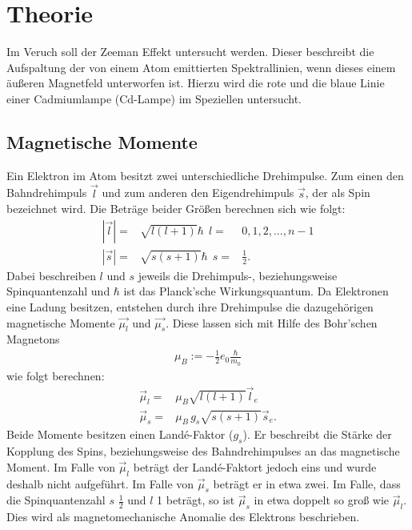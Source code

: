 \section{Theorie}
Im Veruch soll der Zeeman Effekt untersucht werden. Dieser beschreibt die Aufspaltung der
von einem Atom emittierten Spektrallinien, wenn dieses einem äußeren Magnetfeld unterworfen
ist. Hierzu wird die rote und die blaue Linie einer Cadmiumlampe (Cd-Lampe) im Speziellen
untersucht.
\subsection{Magnetische Momente}
Ein Elektron im Atom besitzt zwei unterschiedliche Drehimpulse. Zum einen den Bahndrehimpuls
$\vec{l}$ und zum anderen den Eigendrehimpuls $\vec{s}$, der als Spin bezeichnet wird.
Die Beträge beider Größen berechnen sich wie folgt:
\begin{align*}
    |\vec{l}| =& \sqrt{l(l+1)}\hbar \ \ l =& {0, 1, 2, ..., n-1}\\
    |\vec{s}| =& \sqrt{s(s+1)}\hbar \ \ s =& \frac{1}{2}.
\end{align*}
Dabei beschreiben $l$ und $s$ jeweils die Drehimpuls-, beziehungsweise Spinquantenzahl
und $\hbar$ ist das Planck'sche Wirkungsquantum.
Da Elektronen eine Ladung besitzen, entstehen durch ihre Drehimpulse die dazugehörigen
magnetische Momente $\vec{\mu_l}$ und $\vec{\mu_s}$.
Diese lassen sich mit Hilfe des Bohr'schen Magnetons
\FloatBarrier
\begin{align*}
    \mu_B := -\frac{1}{2}e_0\frac{\hbar}{m_0}
\end{align*}
wie folgt berechnen:
\begin{align*}
    \vec{\mu}_l =& \mu_B\sqrt{l(l+1)}\vec{l}_e\\
    \vec{\mu}_s =& \mu_B \, g_s \sqrt{s(s+1)} \vec{s}_e .
\end{align*}
Beide Momente besitzen einen Landé-Faktor ($g_s$). Er beschreibt die Stärke der Kopplung des
Spins, beziehungsweise des Bahndrehimpulses an das magnetische Moment. Im Falle von
$\vec{\mu}_l$ beträgt der Landé-Faktort jedoch eins und wurde deshalb nicht aufgeführt.
Im Falle von $\vec{\mu}_s$ beträgt er in etwa zwei.
Im Falle, dass die Spinquantenzahl $s$ $\frac{1}{2}$ und $l$ 1 beträgt, so ist
$\vec{\mu}_s$ in etwa doppelt so groß wie $\vec{\mu}_l$. Dies wird als magnetomechanische
Anomalie des Elektrons beschrieben.

